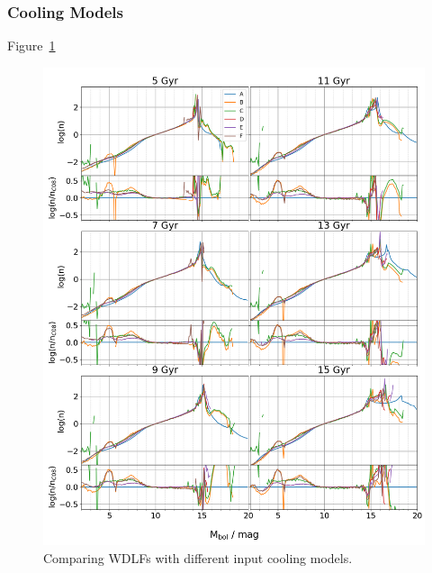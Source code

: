 \documentclass[fleqn,usenatbib]{rasti}
\begin{document}
\subsubsection{Cooling Models}
Figure~\ref{fig:wdlf_compare_da_cooling_models}
\begin{figure}
    \centering
    \includegraphics[width=\textwidth]{wdlf_compare_da_cooling_models.png}
    \caption{Comparing WDLFs with different input cooling models.}
    \label{fig:wdlf_compare_da_cooling_models}
\end{figure}
\end{document}
